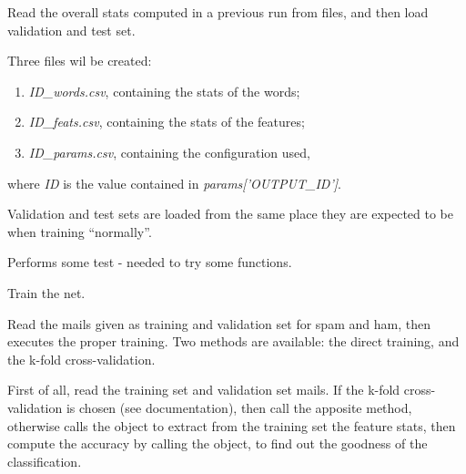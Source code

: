 \documentclass[letterpaper,10pt,english]{sphinxmanual}
\begin{document}
\begin{fulllineitems}

\begin{fulllineitems}
\label{index:naive_bayes.Bayes.read_bayes}
Read the overall stats computed in a previous run from files, and then
load validation and test set.

Three files wil be created:
\begin{enumerate}
\item {} 
\emph{ID\_words.csv}, containing the stats of the words;

\item {} 
\emph{ID\_feats.csv}, containing the stats of the features;

\item {} 
\emph{ID\_params.csv}, containing the configuration used,

\end{enumerate}

where \emph{ID} is the value contained in \emph{params{[}'OUTPUT\_ID'{]}}.

Validation and test sets are loaded from the same place they are
expected to be when training ``normally''.

\end{fulllineitems}


\begin{fulllineitems}
\label{index:naive_bayes.Bayes.test_bayes}
Performs some test - needed to try some functions.

\end{fulllineitems}


\begin{fulllineitems}
\label{index:naive_bayes.Bayes.train}
Train the net.

Read the mails given as training and validation set for spam and ham,
then executes the proper training. Two methods are available: the direct
training, and the k-fold cross-validation.

First of all, read the training set and validation set mails.
If the k-fold cross-validation is chosen (see {\hyperref[index:config.Config]{}}
documentation), then call the apposite method, otherwise calls the
{\hyperref[index:trainer.Trainer]{}} object to extract from the training set
the feature stats, then compute the accuracy by calling the
{\hyperref[index:naive_bayes.Bayes.validate]{}} object, to find out the goodness of
the classification.


\end{fulllineitems}
\end{fulllineitems}
\end{document}
